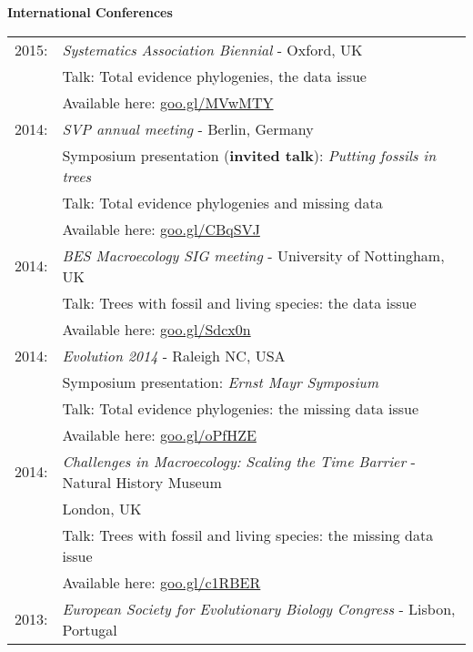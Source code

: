 \documentclass[10pt,a4paper]{article}
\begin{document}
{\raggedright\textbf{International Conferences}\\[1.5ex]
\begin{tabular}{ll}
2015: & \textit{Systematics Association Biennial} - Oxford, UK\\
& Talk: Total evidence phylogenies, the data issue\\ 
& Available here: \href{http://www.slideshare.net/ThomasGuillerme/total-evidence-phylogenies-the-missing-data-issue}{goo.gl/MVwMTY}\\
2014: & \textit{SVP annual meeting} - Berlin, Germany\\
& Symposium presentation (\textbf{invited talk}): \textit{Putting fossils in trees}\\
& Talk: Total evidence phylogenies and missing data\\
& Available here: \href{http://figshare.com/articles/Total_evidence_phylogenies_the_missing_data_issue/1086216}{goo.gl/CBqSVJ}\\
2014: & \textit{BES Macroecology SIG meeting} - University of Nottingham, UK\\
& Talk: Trees with fossil and living species: the data issue\\ 
& Available here: \href{http://figshare.com/articles/Trees_with_fossil_and_living_species_the_data_issue/1056307}{goo.gl/Sdcx0n}\\
2014: & \textit{Evolution 2014} - Raleigh NC, USA\\
& Symposium presentation: \textit{Ernst Mayr Symposium} \\
& Talk: Total evidence phylogenies: the missing data issue\\
& Available here: \href{http://figshare.com/articles/Total_evidence_phylogenies_the_missing_data_issue/1086216}{goo.gl/oPfHZE}\\
2014: & \textit{Challenges in Macroecology: Scaling the Time Barrier} - Natural History Museum \\
& London, UK\\
& Talk: Trees with fossil and living species: the missing data issue\\
& Available here: \href{http://figshare.com/articles/Trees_with_fossil_and_living_species_the_data_issue/1056307}{goo.gl/c1RBER}\\
2013: & \textit{European Society for Evolutionary Biology Congress} - Lisbon, Portugal\\

\end{tabular}}
\end{document}
